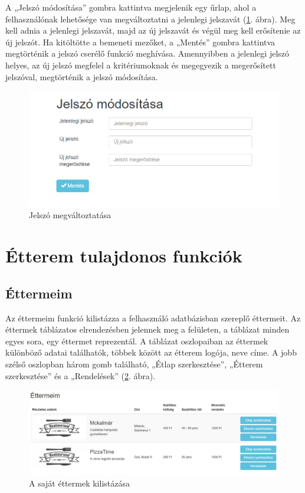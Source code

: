 A „Jelszó módosítása” gombra kattintva megjelenik egy űrlap, ahol a felhasználónak lehetősége van megváltoztatni a jelenlegi jelszavát (\ref{fig:password}. ábra). Meg kell adnia a jelenlegi jelszavát, majd az új jelszavát és végül meg kell erősítenie az új jelszót. Ha kitöltötte a bemeneti mezőket, a „Mentés” gombra kattintva megtörténik a jelszó cserélő funkció meghívása. Amennyibben a jelenlegi jelszó helyes, az új jelszó megfelel a kritériumoknak és megegyezik a megerősített jelszóval, megtörténik a jelszó módosítása.

\begin{figure}
\centering
\includegraphics[scale=0.8]{kepek/password.png}
\caption{Jelszó megváltoztatása}
\label{fig:password}
\end{figure}

\section{Étterem tulajdonos funkciók}

\subsection{Éttermeim}

Az éttermeim funkció kilistázza a felhasználó adatbázisban szereplő éttermeit. Az éttermek táblázatos elrendezésben jelennek meg a felületen, a táblázat minden egyes sora, egy éttermet reprezentál. A táblázat oszlopaiban az éttermek különböző adatai találhatók, többek között az étterem logója, neve címe. A jobb szélső oszlopban három gomb található, „Étlap szerkesztése”, „Étterem szerkesztése” és a „Rendelések” (\ref{fig:my_restaurants}. ábra).

\begin{figure}
\centering
\includegraphics[scale=0.5]{kepek/my_restaurants.png}
\caption{A saját éttermek kilistázása}
\label{fig:my_restaurants}
\end{figure}

